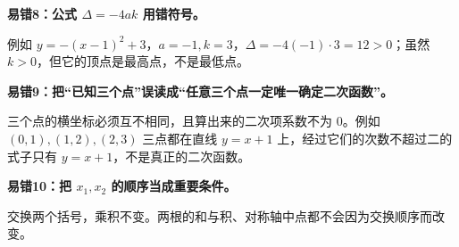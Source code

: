 \clearpage
\begin{trapbox}
\textbf{\textcolor{CTrap}{易错8：公式 $\Delta=-4ak$ 用错符号。}}


例如 $y=-(x-1)^2+3$，$a=-1,k=3$，$\Delta=-4(-1)\cdot3=12>0$；虽然 $k>0$，但它的顶点是最高点，不是最低点。


\end{trapbox}
\clearpage
\begin{trapbox}
\textbf{\textcolor{CTrap}{易错9：把“已知三个点”误读成“任意三个点一定唯一确定二次函数”。}}


三个点的横坐标必须互不相同，且算出来的二次项系数不为 $0$。例如 $(0,1),(1,2),(2,3)$ 三点都在直线 $y=x+1$ 上，经过它们的次数不超过二的式子只有 $y=x+1$，不是真正的二次函数。


\end{trapbox}
\clearpage
\begin{trapbox}
\textbf{\textcolor{CTrap}{易错10：把 $x_1,x_2$ 的顺序当成重要条件。}}


交换两个括号，乘积不变。两根的和与积、对称轴中点都不会因为交换顺序而改变。


\end{trapbox}

